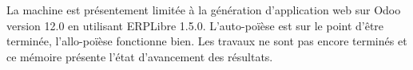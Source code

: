 La machine est présentement limitée à la génération d'application web sur Odoo version 12.0 en utilisant ERPLibre 1.5.0. L'auto-poïèse est sur le point d'être terminée, l'allo-poïèse fonctionne bien. Les travaux ne sont pas encore terminés et ce mémoire présente l'état d'avancement des résultats.




